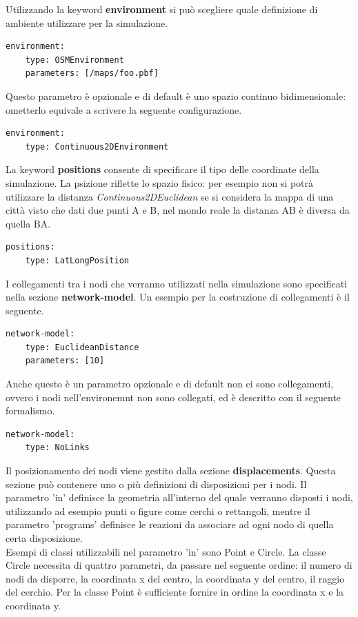 \documentclass[12pt,a4paper,openright,twoside]{report}
\begin{document}
Utilizzando la keyword \textbf{environment} si pu\`o scegliere quale definizione di ambiente utilizzare per la simulazione.
\medskip
\begin{lstlisting}[firstnumber=last,caption={Environment}]
  environment:
    type: OSMEnvironment
    parameters: [/maps/foo.pbf]
\end{lstlisting}
Questo parametro \`e opzionale e di default \`e uno spazio continuo bidimensionale: ometterlo equivale a scrivere la seguente configurazione.
\medskip
\begin{lstlisting}[firstnumber=last,caption={Default environment}]
  environment:
    type: Continuous2DEnvironment
\end{lstlisting}

La keyword \textbf{positions} consente di specificare il tipo delle coordinate della simulazione. La psizione riflette lo spazio fisico: per esempio non si potr\`a utilizzare la distanza \textit{Continuous2DEuclidean} se si considera la mappa di una citt\`a visto che dati due punti A e B, nel mondo reale la distanza AB \`e diversa da quella BA.
\medskip
\begin{lstlisting}[firstnumber=last,caption={Posizioni}]
  positions:
    type: LatLongPosition
\end{lstlisting}

I collegamenti tra i nodi che verranno utilizzati nella simulazione sono specificati nella sezione \textbf{network-model}. Un esempio per la costruzione di collegamenti \`e il seguente.
\medskip
\begin{lstlisting}[firstnumber=last,caption={Funzione linking-rule}]
  network-model:
    type: EuclideanDistance
    parameters: [10]
\end{lstlisting}
Anche questo \`e un parametro opzionale e di default non ci sono collegamenti, ovvero i nodi nell'environemnt non sono collegati, ed \`e descritto con il seguente formalismo.
\medskip
\begin{lstlisting}[firstnumber=last,caption={Default linking-rule}]
  network-model:
    type: NoLinks
\end{lstlisting}

Il posizionamento dei nodi viene gestito dalla sezione \textbf{displacements}. Questa sezione pu\`o contenere uno o pi\`u definizioni di disposizioni per i nodi.
Il parametro 'in' definisce la geometria all'interno del quale verranno disposti i nodi, utilizzando ad esempio punti o figure come cerchi o rettangoli, mentre il parametro 'programs' definisce le reazioni da associare ad ogni nodo di quella certa disposizione.
\\
Esempi di classi utilizzabili nel parametro 'in' sono Point e Circle.
La classe Circle necessita di quattro parametri, da passare nel seguente ordine: il numero di nodi da disporre, la coordinata x del centro, la coordinata y del centro, il raggio del cerchio. Per la classe Point \`e sufficiente fornire in ordine la coordinata x e la coordinata y.
\end{document}
